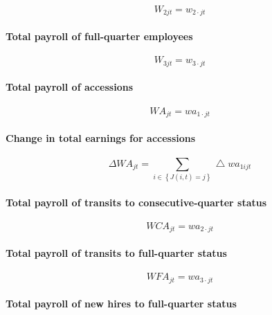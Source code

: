 \begin{equation}
W_{2jt} = w_{2\cdot jt}
\end{equation}

\paragraph{Total payroll of full-quarter employees}

\begin{equation}
W_{3jt} = w_{3\cdot jt}
\end{equation}

\paragraph{Total payroll of accessions}

\begin{equation}
WA_{jt} = wa_{1\cdot jt}
\end{equation}

\paragraph{Change in total earnings for accessions}

\begin{equation}
\Delta WA_{jt}=\sum\limits_{i\in \left\{ {J(i,t)=j}\right\} }\bigtriangleup
wa_{1ijt}
\end{equation}

\paragraph{Total payroll of transits to consecutive-quarter status}

\begin{equation}
WCA_{jt}=wa_{2\cdot jt}
\end{equation}

\paragraph{Total payroll of transits to full-quarter status}

\begin{equation}
WFA_{jt}=wa_{3\cdot jt}
\end{equation}

\paragraph{Total payroll of new hires to full-quarter status}

